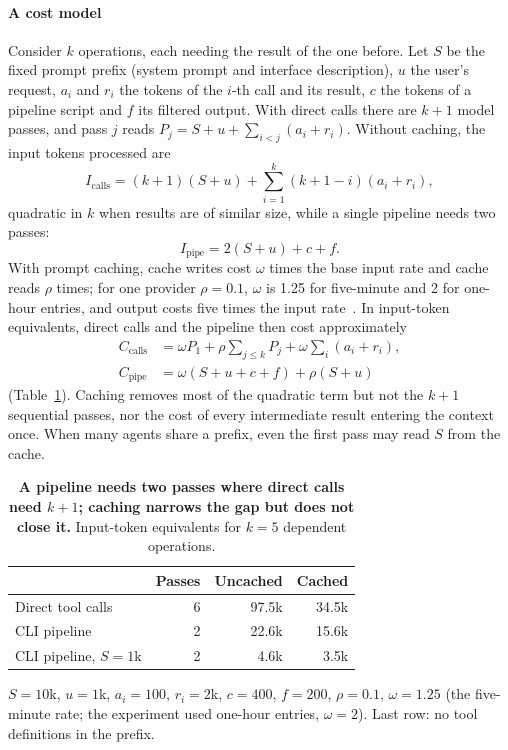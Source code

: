 \documentclass[sigconf,nonacm]{acmart}
\begin{document}
\paragraph{A cost model}
Consider $k$ operations, each needing the result of the one before. Let $S$ be the fixed prompt prefix (system prompt and interface description), $u$ the user's request, $a_i$ and $r_i$ the tokens of the $i$-th call and its result, $c$ the tokens of a pipeline script and $f$ its filtered output. With direct calls there are $k+1$ model passes, and pass $j$ reads $P_j = S + u + \sum_{i<j}(a_i + r_i)$. Without caching, the input tokens processed are
\begin{equation}
I_{\text{calls}} = (k+1)(S+u) + \sum_{i=1}^{k}(k+1-i)(a_i+r_i),
\label{eq:calls}
\end{equation}
quadratic in $k$ when results are of similar size, while a single pipeline needs two passes:
\begin{equation}
I_{\text{pipe}} = 2(S+u) + c + f.
\label{eq:pipe}
\end{equation}
With prompt caching, cache writes cost $\omega$ times the base input rate and cache reads $\rho$ times; for one provider $\rho = 0.1$, $\omega$ is 1.25 for five-minute and 2 for one-hour entries, and output costs five times the input rate~\cite{anthropic2026caching}. In input-token equivalents, direct calls and the pipeline then cost approximately
\begin{align}
C_{\text{calls}} &= \omega P_1 + \rho \textstyle\sum_{j\le k} P_j + \omega \sum_{i} (a_i + r_i), \label{eq:ccalls}\\
C_{\text{pipe}} &= \omega (S+u+c+f) + \rho (S+u) \label{eq:cpipe}
\end{align}
(Table~\ref{tab:cost}). Caching removes most of the quadratic term but not the $k+1$ sequential passes, nor the cost of every intermediate result entering the context once. When many agents share a prefix, even the first pass may read $S$ from the cache.

\begin{table}[t]
\caption{\textbf{A pipeline needs two passes where direct calls need $k+1$; caching narrows the gap but does not close it.} Input-token equivalents for $k=5$ dependent operations.}
\label{tab:cost}
\small
\begin{tabular}{@{}lrrr@{}}
\toprule
 & \textbf{Passes} & \textbf{Uncached} & \textbf{Cached} \\
\midrule
Direct tool calls & 6 & 97.5k & 34.5k \\
CLI pipeline & 2 & 22.6k & 15.6k \\
CLI pipeline, $S=1$k & 2 & 4.6k & 3.5k \\
\bottomrule
\end{tabular}

\smallskip\footnotesize $S=10$k, $u=1$k, $a_i=100$, $r_i=2$k, $c=400$, $f=200$, $\rho=0.1$, $\omega=1.25$ (the five-minute rate; the experiment used one-hour entries, $\omega=2$). Last row: no tool definitions in the prefix.
\end{table}
\end{document}
